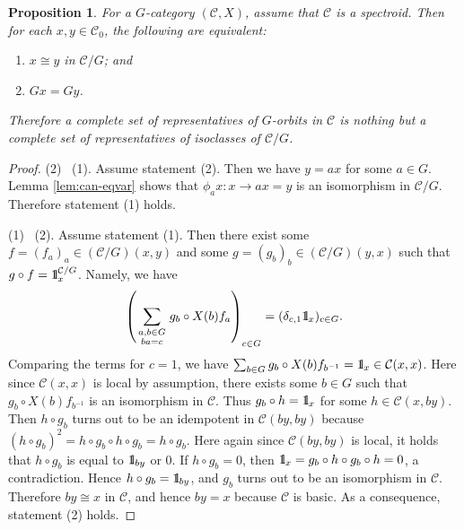\documentclass{surv-l}
\numberwithin{equation}{chapter}
\numberwithin{figure}{chapter}
\theoremstyle{plain}
\newtheorem{prp}[thm]{Proposition}
\theoremstyle{definition}
\theoremstyle{remark}
\newcommand{\id}{1\kern-.25em{\text{{\rm l}}}}
\begin{document}
\begin{prp}\label{prp:skel-orbit-cat}
For a $G$-category $({\mathcal{C}}, X)$, assume that ${\mathcal{C}}$ is a spectroid.
Then for each $x, y \in {\mathcal{C}}_0$, the following are equivalent:
\begin{enumerate}
\item
$x \cong y$ in ${\mathcal{C}}/G$; and
\item
$Gx = Gy$.
\end{enumerate}
Therefore a complete set of representatives of $G$-orbits in ${\mathcal{C}}$ is nothing but
a complete set of representatives of isoclasses of ${\mathcal{C}}/G$.
\end{prp}

\begin{proof}
(2) \text{$\Rightarrow$}\  (1).
Assume statement (2).  Then we have $y = ax$ for some $a \in G$.
Lemma \ref{lem:can-eqvar} shows that $\phi_a x \colon x \to ax = y$
is an isomorphism in ${\mathcal{C}}/G$.
Therefore statement (1) holds.

(1) \text{$\Rightarrow$}\  (2).
Assume statement (1).  Then there exist some $f = (f_a)_a \in ({\mathcal{C}}/G)(x, y)$
and some $g = (g_b)_b \in ({\mathcal{C}}/G)(y, x)$ such that
$g \circ f = \id^{{\mathcal{C}}/G}_x$.
Namely, we have
\[
\left(\sum_{\begin{smallmatrix} a, b \in G\\ba = c \end{smallmatrix}}g_b \circ X(b)f_a\right)_{c \in G} =
(\delta_{c,1} \id_x)_{c \in G}.
\]
Comparing the terms for $c=1$, we have
$\sum_{b\in G} g_b \circ X(b)f_{b^{-1}} = \id_x \in {\mathcal{C}}(x, x)$.
Here since ${\mathcal{C}}(x,x)$ is local by assumption, there exists some
$b\in G$ such that $g_b \circ X(b)f_{b^{-1}}$ is an isomorphism in ${\mathcal{C}}$.
Thus $g_b \circ h = \id_x$ for some $h \in {\mathcal{C}}(x, by)$.
Then $h \circ g_b$ turns out to be an idempotent in ${\mathcal{C}}(by, by)$
because $(h \circ g_b)^2 = h \circ g_b \circ h \circ g_b = h \circ g_b$.
Here again since ${\mathcal{C}}(by, by)$ is local, it holds that
$h \circ g_b$ is equal to $\id_{by}$ or 0.
If $h \circ g_b = 0$, then $\id_x = g_b\circ h\circ g_b \circ h = 0$, a contradiction.
Hence $h \circ g_b = \id_{by}$, and
$g_b$ turns out to be an isomorphism in ${\mathcal{C}}$.
Therefore $by \cong x$ in ${\mathcal{C}}$, and hence $by = x$ because ${\mathcal{C}}$ is basic.
As a consequence, statement (2) holds.
\end{proof}
\end{document}
